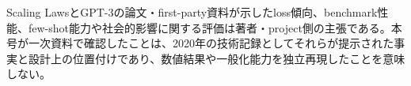 \begin{claimboundary}
Scaling LawsとGPT-3の論文・first-party資料が示したloss傾向、benchmark性能、few-shot能力や社会的影響に関する評価は著者・project側の主張である。本号が一次資料で確認したことは、2020年の技術記録としてそれらが提示された事実と設計上の位置付けであり、数値結果や一般化能力を独立再現したことを意味しない。\autocite{src-0fc45aa25dc7,src-7a3002b6ab1d,src-8f27ffb5bc66}
\end{claimboundary}

